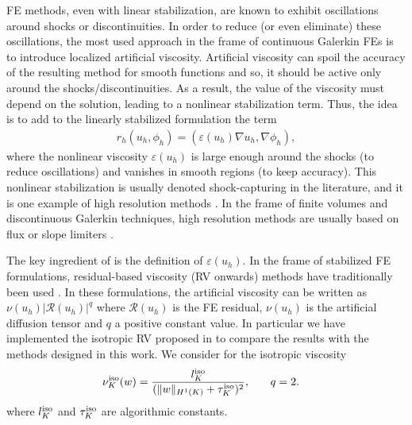 FE methods, even with linear stabilization, are known to exhibit oscillations around shocks or discontinuities. 
In order to reduce (or even eliminate) these oscillations, the most used approach 
in the frame of continuous Galerkin FEs is to introduce localized  artificial 
viscosity. Artificial viscosity can spoil the accuracy of the resulting method for smooth functions 
and so, it should be active only
around the shocks/discontinuities. As a result, the value of the viscosity must depend on the solution, leading
to a nonlinear stabilization term. Thus, the idea is to add to the linearly stabilized formulation the term
\begin{align}\label{eq-nonlin}
r_h(u_h,\phi_h) = (\varepsilon(u_h) \nabla u_h, \nabla \phi_h),
\end{align}
where the nonlinear viscosity $\varepsilon(u_h)$ is large enough around the shocks (to reduce oscillations)
and vanishes in smooth regions (to keep accuracy). This nonlinear stabilization is usually 
denoted  shock-capturing in the literature, and it is one example of high resolution methods \cite{leveque_finite_2002}.  
In the frame of finite volumes and discontinuous Galerkin techniques, high resolution methods
are usually based on flux or slope limiters \cite{krivodonova_limiters_2007}.

The key ingredient of  is the definition of $\varepsilon(u_h)$.
In the frame of stabilized FE formulations, residual-based viscosity (RV onwards) methods have traditionally been used \cite{johnson_convergence_1987,johnson_convergence_1990,lube_residual-based_2006,codina_discontinuity-capturing_1993,barrenechea_local_2013,john_spurious_2007,john_spurious_2008,galeao_consistent_1988,gomes_dutra_do_carmo_feedback_1991}. In these formulations, the artificial viscosity can be
written as $\nu(u_h) |\mathcal{R}(u_h)|^q$ where $\mathcal{R}(u_h)$ is the FE residual, $\nu(u_h)$ is the artificial diffusion tensor and $q$ a positive constant value. In particular we have implemented the isotropic RV proposed in \cite{lube_residual-based_2006} to compare the results with the methods designed in this work. We consider for the isotropic viscosity
\begin{align}\label{eq-isosc}
  \nu_K^{\rm iso}(w) = \frac{l_K^{\rm iso}}{(\|w\|_{H^1(K)} + \tau_K^{\rm iso})^2}, \quad & \quad q = 2.
\end{align}
where $l_K^{\rm iso}$ and $\tau_K^{\rm iso}$ %
 are algorithmic constants.

